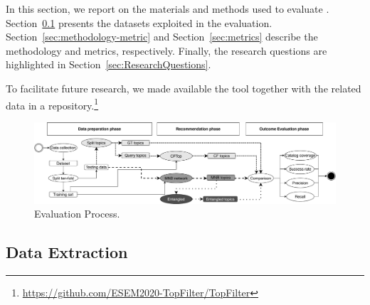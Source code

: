 





In this section, we report on the materials and methods used to evaluate \TF. %
Section~\ref{sec:Dataset} presents the datasets exploited in the evaluation. Section~\ref{sec:methodology-metric} and Section~\ref{sec:metrics} describe the methodology and metrics, respectively. Finally, the research questions are highlighted in Section~\ref{sec:ResearchQuestions}.

To facilitate future research, we made available the \TF tool together with the related data in a \GH repository.\footnote{\url{https://github.com/ESEM2020-TopFilter/TopFilter}}


\begin{figure}[h!]
	\centering
	\includegraphics[width=0.9\linewidth,keepaspectratio]{figs/evaluationCF.pdf}
	\caption{Evaluation Process.}
	\label{fig:EvaluationProcess}
	\vspace{-.3cm}
\end{figure}

\subsection{Data Extraction} \label{sec:Dataset}








